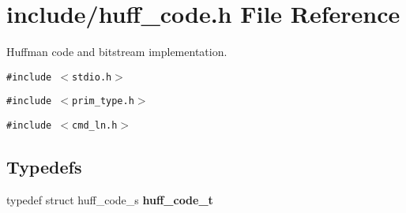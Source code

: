 \section{include/huff\_\-code.h File Reference}
\label{huff__code_8h}
Huffman code and bitstream implementation.  


{\tt \#include $<$stdio.h$>$}\par
{\tt \#include $<$prim\_\-type.h$>$}\par
{\tt \#include $<$cmd\_\-ln.h$>$}\par
\subsection*{Typedefs}
\begin{CompactItemize}
\item 
typedef struct huff\_\-code\_\-s \textbf{huff\_\-code\_\-t}\label{huff__code_8h_99a5188e6a18682c96100cd5232af0f4}

\end{CompactItemize}
